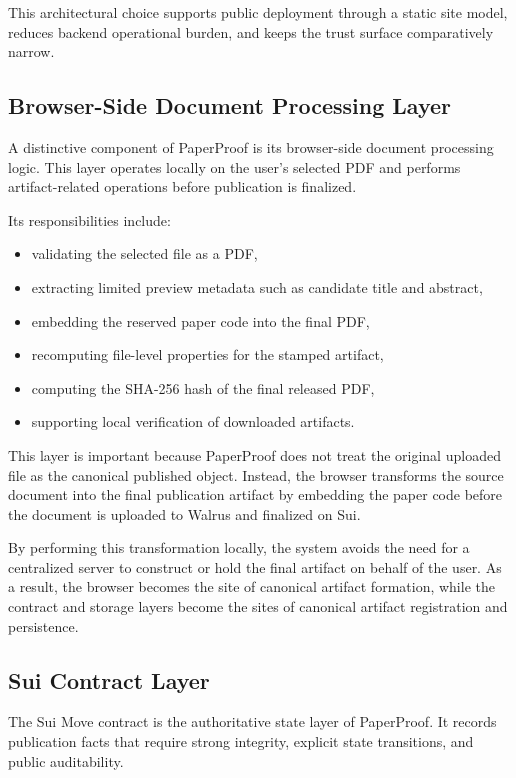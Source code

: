\documentclass[journal]{IEEEtran}
\begin{document}
This architectural choice supports public deployment through a static site model, reduces backend operational burden, and keeps the trust surface comparatively narrow.

\subsection{Browser-Side Document Processing Layer}

A distinctive component of PaperProof is its browser-side document processing logic. This layer operates locally on the user's selected PDF and performs artifact-related operations before publication is finalized.

Its responsibilities include:
\begin{itemize}
    \item validating the selected file as a PDF,
    \item extracting limited preview metadata such as candidate title and abstract,
    \item embedding the reserved paper code into the final PDF,
    \item recomputing file-level properties for the stamped artifact,
    \item computing the SHA-256 hash of the final released PDF,
    \item supporting local verification of downloaded artifacts.
\end{itemize}


This layer is important because PaperProof does not treat the original uploaded file as the canonical published object. Instead, the browser transforms the source document into the final publication artifact by embedding the paper code before the document is uploaded to Walrus and finalized on Sui.

By performing this transformation locally, the system avoids the need for a centralized server to construct or hold the final artifact on behalf of the user. As a result, the browser becomes the site of canonical artifact formation, while the contract and storage layers become the sites of canonical artifact registration and persistence.

\subsection{Sui Contract Layer}

The Sui Move contract is the authoritative state layer of PaperProof. It records publication facts that require strong integrity, explicit state transitions, and public auditability.
\end{document}
